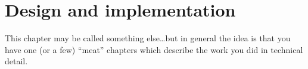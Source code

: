 \chapter{Design and implementation}

This chapter may be called something else\ldots but in general the
idea is that you have one (or a few) ``meat'' chapters which describe
the work you did in technical detail.
